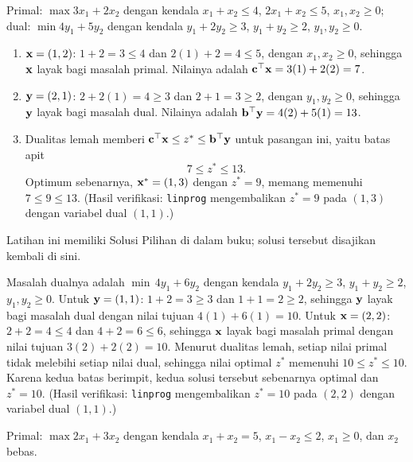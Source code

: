 
Primal: $\max 3x_1 + 2x_2$ dengan kendala $x_1 + x_2 \le 4$, $2x_1 + x_2 \le 5$, $x_1, x_2 \ge 0$; dual: $\min 4y_1 + 5y_2$ dengan kendala $y_1 + 2y_2 \ge 3$, $y_1 + y_2 \ge 2$, $y_1, y_2 \ge 0$.

\begin{enumerate}
\item $\mathbf{x} = (1, 2)$: $1 + 2 = 3 \le 4$ dan $2(1) + 2 = 4 \le 5$, dengan $x_1, x_2 \ge 0$, sehingga $\mathbf{x}$ layak bagi masalah primal. Nilainya adalah $\mathbf{c}^\top\mathbf{x} = 3(1) + 2(2) = 7$.
\item $\mathbf{y} = (2, 1)$: $2 + 2(1) = 4 \ge 3$ dan $2 + 1 = 3 \ge 2$, dengan $y_1, y_2 \ge 0$, sehingga $\mathbf{y}$ layak bagi masalah dual. Nilainya adalah $\mathbf{b}^\top\mathbf{y} = 4(2) + 5(1) = 13$.
\item Dualitas lemah memberi $\mathbf{c}^\top\mathbf{x} \le z^* \le \mathbf{b}^\top\mathbf{y}$ untuk pasangan ini, yaitu batas apit
\[
7 \le z^* \le 13 .
\]
Optimum sebenarnya, $\mathbf{x}^* = (1, 3)$ dengan $z^* = 9$, memang memenuhi $7 \le 9 \le 13$. (Hasil verifikasi: \texttt{linprog} mengembalikan $z^* = 9$ pada $(1,3)$ dengan variabel dual $(1,1)$.)
\end{enumerate}


Latihan ini memiliki Solusi Pilihan di dalam buku; solusi tersebut disajikan kembali di sini.

Masalah dualnya adalah $\min\, 4y_1 + 6y_2$ dengan kendala $y_1 + 2y_2 \geq 3$, $y_1 + y_2 \geq 2$, $y_1, y_2 \geq 0$.
Untuk $\mathbf{y} = (1,1)$: $1 + 2 = 3 \geq 3$ dan $1 + 1 = 2 \geq 2$, sehingga $\mathbf{y}$ layak bagi masalah dual dengan nilai tujuan $4(1) + 6(1) = 10$.
Untuk $\mathbf{x} = (2,2)$: $2 + 2 = 4 \leq 4$ dan $4 + 2 = 6 \leq 6$, sehingga $\mathbf{x}$ layak bagi masalah primal dengan nilai tujuan $3(2) + 2(2) = 10$.
Menurut dualitas lemah, setiap nilai primal tidak melebihi setiap nilai dual, sehingga nilai optimal $z^*$ memenuhi $10 \leq z^* \leq 10$. Karena kedua batas berimpit, kedua solusi tersebut sebenarnya optimal dan $z^* = 10$. (Hasil verifikasi: \texttt{linprog} mengembalikan $z^* = 10$ pada $(2,2)$ dengan variabel dual $(1,1)$.)


Primal: $\max 2x_1 + 3x_2$ dengan kendala $x_1 + x_2 = 5$, $x_1 - x_2 \le 2$, $x_1 \ge 0$, dan $x_2$ bebas.

